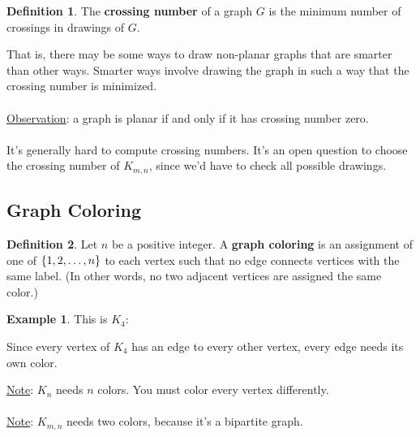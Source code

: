 \documentclass[]{article}
\theoremstyle{definition}
\newtheorem*{defn}{Definition}
\newtheorem{ex}{Example}[section]
\DeclarePairedDelimiter{\set}{\lbrace}{\rbrace}
\begin{document}
			\begin{defn}
				The \textbf{crossing number} of a graph $G$ is the minimum number of crossings in drawings of $G$.
			\end{defn}
			
			That is, there may be some ways to draw non-planar graphs that are smarter than other ways. Smarter ways involve drawing the graph in such a way that the crossing number is minimized.
			\\ \\
			\underline{Observation}: a graph is planar if and only if it has crossing number zero.
			\\ \\
			It's generally hard to compute crossing numbers. It's an open question to choose the crossing number of $K_{m, n}$, since we'd have to check all possible drawings.

		\subsection{Graph Coloring}
			\begin{defn}
				Let $n$ be a positive integer. A \textbf{graph coloring} is an assignment of one of $\set{1, 2, \ldots, n}$ to each vertex such that no edge connects vertices with the same label. (In other words, no two adjacent vertices are assigned the same color.)
			\end{defn}
			
			\begin{ex}
				This is $K_4$:
				\begin{center}
				\end{center}
			
				Since every vertex of $K_4$ has an edge to every other vertex, every edge needs its own color.
			\end{ex}

			\underline{Note}: $K_n$ needs $n$ colors. You must color every vertex differently.
			\\ \\
			\underline{Note}: $K_{m, n}$ needs two colors, because it's a bipartite graph.
			
\end{document}
